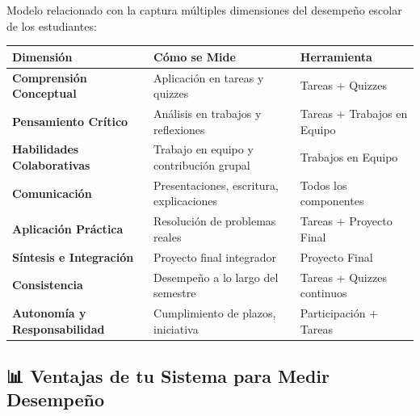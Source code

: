 \documentclass[
  spanish,
  12pt,
  letterpaper,
  DIV=11,
  numbers=noendperiod]{scrreprt}
\newcounter{none} %
\begin{document}
Modelo relacionado con la captura múltiples dimensiones del desempeño
escolar de los estudiantes:

{\def\LTcaptype{none} %
\begin{longtable}[]{@{}
  >{\raggedright\arraybackslash}p{}
  >{\raggedright\arraybackslash}p{}
  >{\raggedright\arraybackslash}p{}@{}}
\toprule\noalign{}
\begin{minipage}[b]{\linewidth}\raggedright
Dimensión
\end{minipage} & \begin{minipage}[b]{\linewidth}\raggedright
Cómo se Mide
\end{minipage} & \begin{minipage}[b]{\linewidth}\raggedright
Herramienta
\end{minipage} \\
\midrule\noalign{}
\endhead
\bottomrule\noalign{}
\endlastfoot
\textbf{Comprensión Conceptual} & Aplicación en tareas y quizzes &
Tareas + Quizzes \\
\textbf{Pensamiento Crítico} & Análisis en trabajos y reflexiones &
Tareas + Trabajos en Equipo \\
\textbf{Habilidades Colaborativas} & Trabajo en equipo y contribución
grupal & Trabajos en Equipo \\
\textbf{Comunicación} & Presentaciones, escritura, explicaciones & Todos
los componentes \\
\textbf{Aplicación Práctica} & Resolución de problemas reales & Tareas +
Proyecto Final \\
\textbf{Síntesis e Integración} & Proyecto final integrador & Proyecto
Final \\
\textbf{Consistencia} & Desempeño a lo largo del semestre & Tareas +
Quizzes continuos \\
\textbf{Autonomía y Responsabilidad} & Cumplimiento de plazos,
iniciativa & Participación + Tareas \\
\end{longtable}
}

\subsection{\texorpdfstring{\textbf{📊 Ventajas de tu Sistema para Medir
Desempeño}}{📊 Ventajas de tu Sistema para Medir Desempeño}}\label{ventajas-de-tu-sistema-para-medir-desempeuxf1o}
\end{document}
